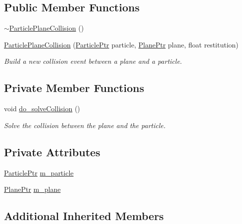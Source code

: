 \subsection*{Public Member Functions}
\begin{DoxyCompactItemize}
\item 
\hyperlink{classParticlePlaneCollision_a155964653537ec6de0e91b25d3f7aa44}{$\sim$\+Particle\+Plane\+Collision} ()
\item 
\hyperlink{classParticlePlaneCollision_a5432307edb35e9762d9267c4146be9b3}{Particle\+Plane\+Collision} (\hyperlink{Particle_8hpp_a9a7abc8635002993537b61ef2c857fdd}{Particle\+Ptr} particle, \hyperlink{Plane_8hpp_a146e10989049e4a48eae6973c2f798f5}{Plane\+Ptr} plane, float restitution)
\begin{DoxyCompactList}\small\item\em Build a new collision event between a plane and a particle. \end{DoxyCompactList}\end{DoxyCompactItemize}
\subsection*{Private Member Functions}
\begin{DoxyCompactItemize}
\item 
void \hyperlink{classParticlePlaneCollision_a1516ee9898275c1ad9bfbc8bad675b1b}{do\+\_\+solve\+Collision} ()
\begin{DoxyCompactList}\small\item\em Solve the collision between the plane and the particle. \end{DoxyCompactList}\end{DoxyCompactItemize}
\subsection*{Private Attributes}
\begin{DoxyCompactItemize}
\item 
\hyperlink{Particle_8hpp_a9a7abc8635002993537b61ef2c857fdd}{Particle\+Ptr} \hyperlink{classParticlePlaneCollision_a26c423083839ce4155c62f422f03361b}{m\+\_\+particle}
\item 
\hyperlink{Plane_8hpp_a146e10989049e4a48eae6973c2f798f5}{Plane\+Ptr} \hyperlink{classParticlePlaneCollision_aad67527436168ca3413b7c7dba3f146c}{m\+\_\+plane}
\end{DoxyCompactItemize}
\subsection*{Additional Inherited Members}


